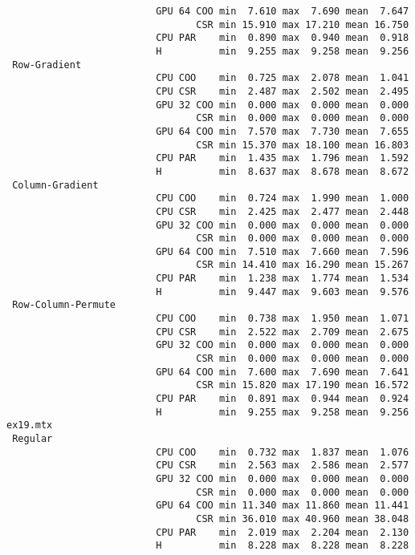 \begin{verbatim}
                          GPU 64 COO min  7.610 max  7.690 mean  7.647
                                 CSR min 15.910 max 17.210 mean 16.750
                          CPU PAR    min  0.890 max  0.940 mean  0.918
                          H          min  9.255 max  9.258 mean  9.256
 Row-Gradient
                          CPU COO    min  0.725 max  2.078 mean  1.041
                          CPU CSR    min  2.487 max  2.502 mean  2.495
                          GPU 32 COO min  0.000 max  0.000 mean  0.000
                                 CSR min  0.000 max  0.000 mean  0.000
                          GPU 64 COO min  7.570 max  7.730 mean  7.655
                                 CSR min 15.370 max 18.100 mean 16.803
                          CPU PAR    min  1.435 max  1.796 mean  1.592
                          H          min  8.637 max  8.678 mean  8.672
 Column-Gradient
                          CPU COO    min  0.724 max  1.990 mean  1.000
                          CPU CSR    min  2.425 max  2.477 mean  2.448
                          GPU 32 COO min  0.000 max  0.000 mean  0.000
                                 CSR min  0.000 max  0.000 mean  0.000
                          GPU 64 COO min  7.510 max  7.660 mean  7.596
                                 CSR min 14.410 max 16.290 mean 15.267
                          CPU PAR    min  1.238 max  1.774 mean  1.534
                          H          min  9.447 max  9.603 mean  9.576
 Row-Column-Permute
                          CPU COO    min  0.738 max  1.950 mean  1.071
                          CPU CSR    min  2.522 max  2.709 mean  2.675
                          GPU 32 COO min  0.000 max  0.000 mean  0.000
                                 CSR min  0.000 max  0.000 mean  0.000
                          GPU 64 COO min  7.600 max  7.690 mean  7.641
                                 CSR min 15.820 max 17.190 mean 16.572
                          CPU PAR    min  0.891 max  0.944 mean  0.924
                          H          min  9.255 max  9.258 mean  9.256
ex19.mtx
 Regular
                          CPU COO    min  0.732 max  1.837 mean  1.076
                          CPU CSR    min  2.563 max  2.586 mean  2.577
                          GPU 32 COO min  0.000 max  0.000 mean  0.000
                                 CSR min  0.000 max  0.000 mean  0.000
                          GPU 64 COO min 11.340 max 11.860 mean 11.441
                                 CSR min 36.010 max 40.960 mean 38.048
                          CPU PAR    min  2.019 max  2.204 mean  2.130
                          H          min  8.228 max  8.228 mean  8.228

\end{verbatim}
